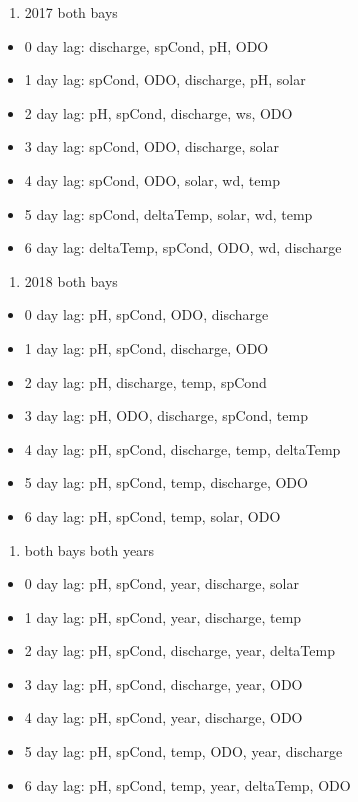 \documentclass[]{article}
\providecommand{\tightlist}{%
  \setlength{\itemsep}{0pt}\setlength{\parskip}{0pt}}
\begin{document}
\begin{enumerate}
\def\labelenumi{\arabic{enumi})}
\setcounter{enumi}{2}
\tightlist
\item
  2017 both bays
\end{enumerate}

\begin{itemize}
\tightlist
\item
  0 day lag: discharge, spCond, pH, ODO
\item
  1 day lag: spCond, ODO, discharge, pH, solar
\item
  2 day lag: pH, spCond, discharge, ws, ODO
\item
  3 day lag: spCond, ODO, discharge, solar
\item
  4 day lag: spCond, ODO, solar, wd, temp
\item
  5 day lag: spCond, deltaTemp, solar, wd, temp
\item
  6 day lag: deltaTemp, spCond, ODO, wd, discharge
\end{itemize}

\begin{enumerate}
\def\labelenumi{\arabic{enumi})}
\setcounter{enumi}{3}
\tightlist
\item
  2018 both bays
\end{enumerate}

\begin{itemize}
\tightlist
\item
  0 day lag: pH, spCond, ODO, discharge
\item
  1 day lag: pH, spCond, discharge, ODO
\item
  2 day lag: pH, discharge, temp, spCond
\item
  3 day lag: pH, ODO, discharge, spCond, temp
\item
  4 day lag: pH, spCond, discharge, temp, deltaTemp
\item
  5 day lag: pH, spCond, temp, discharge, ODO
\item
  6 day lag: pH, spCond, temp, solar, ODO
\end{itemize}

\begin{enumerate}
\def\labelenumi{\arabic{enumi})}
\setcounter{enumi}{4}
\tightlist
\item
  both bays both years
\end{enumerate}

\begin{itemize}
\tightlist
\item
  0 day lag: pH, spCond, year, discharge, solar
\item
  1 day lag: pH, spCond, year, discharge, temp
\item
  2 day lag: pH, spCond, discharge, year, deltaTemp
\item
  3 day lag: pH, spCond, discharge, year, ODO
\item
  4 day lag: pH, spCond, year, discharge, ODO
\item
  5 day lag: pH, spCond, temp, ODO, year, discharge
\item
  6 day lag: pH, spCond, temp, year, deltaTemp, ODO
\end{itemize}
\end{document}
